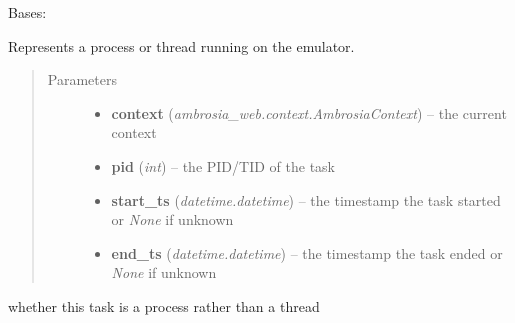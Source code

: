 \documentclass[letterpaper,10pt,english]{sphinxmanual}
\begin{document}

\begin{fulllineitems}
\label{ambrosia.model:ambrosia.model.entities.Task}
Bases: {\hyperref[ambrosia.model:ambrosia.model.Entity]{}}

Represents a process or thread running on the emulator.
\begin{quote}\begin{description}
\item[{Parameters}] \leavevmode\begin{itemize}
\item {} 
\textbf{context} (\emph{ambrosia\_web.context.AmbrosiaContext}) -- the current context

\item {} 
\textbf{pid} (\emph{int}) -- the PID/TID of the task

\item {} 
\textbf{start\_ts} (\emph{datetime.datetime}) -- the timestamp the task started or \emph{None} if unknown

\item {} 
\textbf{end\_ts} (\emph{datetime.datetime}) -- the timestamp the task ended or \emph{None} if unknown

\end{itemize}

\end{description}\end{quote}

\begin{fulllineitems}
\label{ambrosia.model:ambrosia.model.entities.Task.find}
\end{fulllineitems}


\begin{fulllineitems}
\label{ambrosia.model:ambrosia.model.entities.Task.get_serializeable_properties}
\end{fulllineitems}


\begin{fulllineitems}
\label{ambrosia.model:ambrosia.model.entities.Task.is_process}
whether this task is a process rather than a thread

\end{fulllineitems}


\end{fulllineitems}
\end{document}
